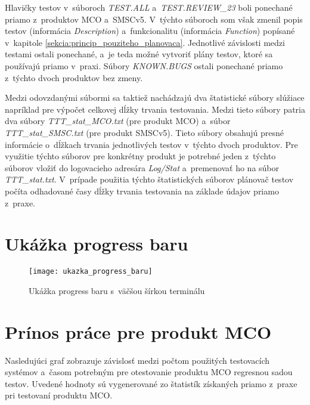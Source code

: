 Hlavičky testov v~súboroch \textit{TEST.ALL} a~\textit{TEST.REVIEW\_23} 
boli ponechané priamo z~produktov MCO a~SMSCv5. V~týchto súboroch som 
však zmenil popis testov (informácia \textit{Description}) 
a~funkcionalitu (informácia \textit{Function}) popísané v~kapitole 
\ref{sekcia:princip_pouziteho_planovaca}.
Jednotlivé závislosti medzi testami ostali ponechané, a~je teda možné 
vytvoriť plány testov, ktoré sa používajú priamo v~praxi.
Súbory \textit{KNOWN.BUGS} ostali ponechané priamo z~týchto dvoch 
produktov bez zmeny. 

Medzi odovzdanými súbormi sa taktiež nachádzajú dva štatistické súbory 
slúžiace napríklad pre výpočet celkovej dĺžky trvania testovania. 
Medzi tieto súbory patria dva súbory \textit{TTT\_stat\_MCO.txt} (pre produkt MCO) 
a~súbor \textit{TTT\_stat\_SMSC.txt} (pre produkt SMSCv5).
Tieto súbory obsahujú presné informácie o~dĺžkach trvania jednotlivých 
testov v~týchto dvoch produktov. 
Pre využitie týchto súborov pre konkrétny produkt je potrebné jeden 
z~týchto súborov vložiť do logovacieho adresára \textit{Log/Stat} 
a~premenovať ho na súbor \textit{TTT\_stat.txt}.
V~prípade použitia týchto štatistických súborov plánovač testov počíta
odhadované časy dĺžky trvania testovania na základe údajov priamo z~praxe.



%
%
\chapter{Ukážka progress baru}
\label{priloha:ukazka_progress_baru}
\begin{figure}[h]
  \begin{center}
    \texttt{[image: ukazka\_progress\_baru]} 
    \caption{Ukážka progress baru s~väčšou šírkou terminálu}
  \end{center}
\end{figure}



%
%
\chapter{Prínos práce pre produkt MCO}
\label{priloha:graf_mco}
Nasledujúci graf zobrazuje závislosť medzi počtom použitých testovacích
systémov a~časom potrebným pre otestovanie produktu MCO regresnou 
sadou testov.
Uvedené hodnoty sú vygenerované zo štatistík získaných priamo z~praxe 
pri testovaní produktu MCO.


